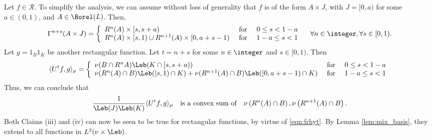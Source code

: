 \documentclass[12pt,oneside]{article}
\newcommand{\MesL}{\nu}
\newcommand{\Rect}{\mathcal{R}}
\newcommand{\Return}{R}
\begin{document}
Let $f\in\Rect$. To simplify the analysis, we can assume without loss of generality that $f$ is of the form $A\times J$, with $J=[0,a)$ for some $a\in (0,1)$, and  $A\in\Borel(L)$.  Then,
%
\[ \Gamma^{n+s}(A\times J) = \left\{ \begin{array}{lcl} \Return^n(A)\times [s,s+a) &\mbox{ for } &0\leq s<1-a \\ \Return^n(A)\times [s,1) \cup \Return^{n+1}(A)\times[0,a+s-1) &\mbox{ for } &1-a \leq s<1 \end{array} \right. \quad \forall n\in\integer, \forall s\in [0,1). \]
%
 Let $g=1_B 1_K$ be another rectangular function. Let $t=n+s$ for some $n\in\integer$ and $s\in[0,1)$. Then
%
\[ \langle U^t f, g \rangle_\mu = \left\{ \begin{array}{lcl}
\MesL(B\cap\Return^n A)\Leb(K\cap [s,s+a)) &\mbox{ for } &0\leq s<1-a \\ 
\MesL(\Return^n(A)\cap B) \Leb([s,1)\cap K) + \MesL(\Return^{n+1}(A)\cap B)\Leb([0,a+s-1)\cap K) &\mbox{ for } &1-a \leq s<1 
\end{array} \right. \]
%
 Thus, we can conclude that
\begin{equation}\label{eqn:frhyt}
\frac{1}{\Leb(J)\Leb(K)} \langle U^t f, g \rangle_\mu \quad \mbox{is a convex sum of} \quad \MesL\left( \Return^{n}(A)\cap B \right), \MesL\left( \Return^{n+1}(A)\cap B \right).
\end{equation}
%
Both Claims (iii) and (iv) can now be seen to be true for rectangular functions, by virtue of \eqref{eqn:frhyt}. By Lemma \ref{lem:mix_basis}, they extend to all functions in $L^2(\MesL\times\Leb)$. 
\end{document}
